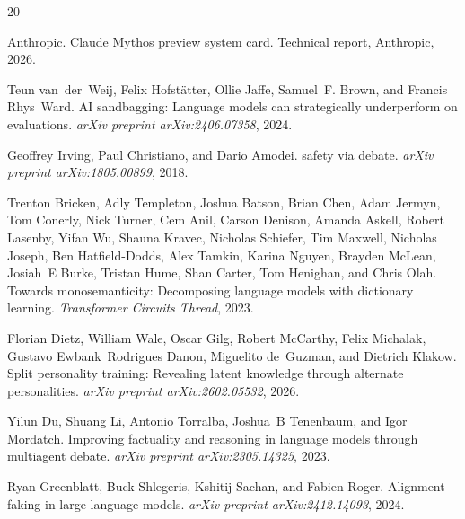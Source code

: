 \documentclass[10pt,twocolumn]{article}
\begin{document}
\begin{thebibliography}{20}

Anthropic.
\newblock Claude {M}ythos preview system card.
\newblock Technical report, Anthropic, 2026.


Teun van~der~Weij, Felix Hofst{\"a}tter, Ollie Jaffe, Samuel~F. Brown, and Francis Rhys~Ward.
\newblock AI sandbagging: Language models can strategically underperform on evaluations.
\newblock \emph{arXiv preprint arXiv:2406.07358}, 2024.

Geoffrey Irving, Paul Christiano, and Dario Amodei.
 safety via debate.
\newblock \emph{arXiv preprint arXiv:1805.00899}, 2018.

Trenton Bricken, Adly Templeton, Joshua Batson, Brian Chen, Adam Jermyn, Tom Conerly, Nick Turner, Cem Anil, Carson Denison, Amanda Askell, Robert Lasenby, Yifan Wu, Shauna Kravec, Nicholas Schiefer, Tim Maxwell, Nicholas Joseph, Ben Hatfield-Dodds, Alex Tamkin, Karina Nguyen, Brayden McLean, Josiah~E Burke, Tristan Hume, Shan Carter, Tom Henighan, and Chris Olah.
\newblock Towards monosemanticity: Decomposing language models with dictionary learning.
\newblock \emph{Transformer Circuits Thread}, 2023.

Florian Dietz, William Wale, Oscar Gilg, Robert McCarthy, Felix Michalak, Gustavo Ewbank~Rodrigues Danon, Miguelito de~Guzman, and Dietrich Klakow.
\newblock Split personality training: Revealing latent knowledge through alternate personalities.
\newblock \emph{arXiv preprint arXiv:2602.05532}, 2026.

Yilun Du, Shuang Li, Antonio Torralba, Joshua~B Tenenbaum, and Igor Mordatch.
\newblock Improving factuality and reasoning in language models through multiagent debate.
\newblock \emph{arXiv preprint arXiv:2305.14325}, 2023.

Ryan Greenblatt, Buck Shlegeris, Kshitij Sachan, and Fabien Roger.
\newblock Alignment faking in large language models.
\newblock \emph{arXiv preprint arXiv:2412.14093}, 2024.


\end{thebibliography}
\end{document}

